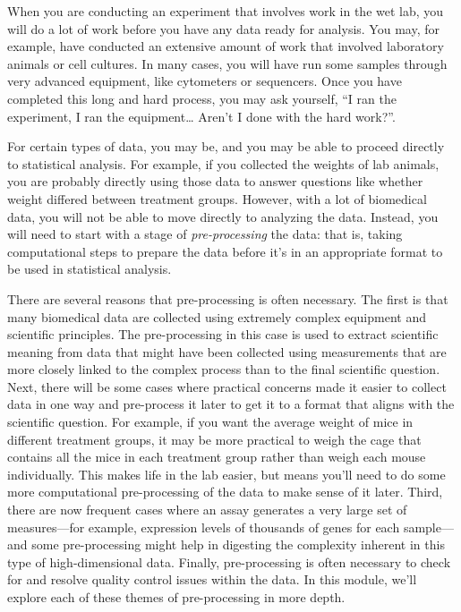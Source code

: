 \documentclass[]{tufte-book}
\begin{document}
When you are conducting an experiment that involves work in the wet lab, you
will do a lot of work before you have any data ready for analysis. You may,
for example, have conducted an extensive amount of work that involved laboratory
animals or cell cultures. In many cases, you will have run some samples through
very advanced equipment, like cytometers or sequencers. Once you have completed
this long and hard process, you may ask yourself, ``I ran the experiment, I ran
the equipment\ldots{} Aren't I done with the hard work?''.

For certain types of data, you may be, and you may be able to proceed directly to
statistical analysis. For example, if you collected the weights of lab animals,
you are probably directly using those data to answer questions like whether weight
differed between treatment groups. However, with a lot of biomedical data, you
will not be able to move directly to analyzing the data. Instead, you will need
to start with a stage of \emph{pre-processing} the data: that is, taking
computational steps to prepare the data before it's in an appropriate format to
be used in statistical analysis.

There are several reasons that pre-processing is often necessary. The first is
that many biomedical data are collected using extremely complex equipment and
scientific principles. The pre-processing in this case is used to extract scientific
meaning from data that might have been collected using measurements that are
more closely linked to the complex process than to the final scientific question.
Next, there will be some cases where practical concerns made it easier to
collect data in one way and pre-process it later to get it to a format that
aligns with the scientific question. For example, if you want the average weight
of mice in different treatment groups, it may be more practical to weigh the
cage that contains all the mice in each treatment group rather than weigh
each mouse individually. This makes life in the lab easier, but means you'll need
to do some more computational pre-processing of the data to make sense of it
later. Third, there are now frequent cases where an assay generates
a very large set of measures---for example, expression levels of thousands of
genes for each sample---and some pre-processing might help in digesting the
complexity inherent in this type of high-dimensional data. Finally, pre-processing
is often necessary to check for and resolve quality control issues within the
data. In this module, we'll explore each of these themes of pre-processing in
more depth.
\end{document}
